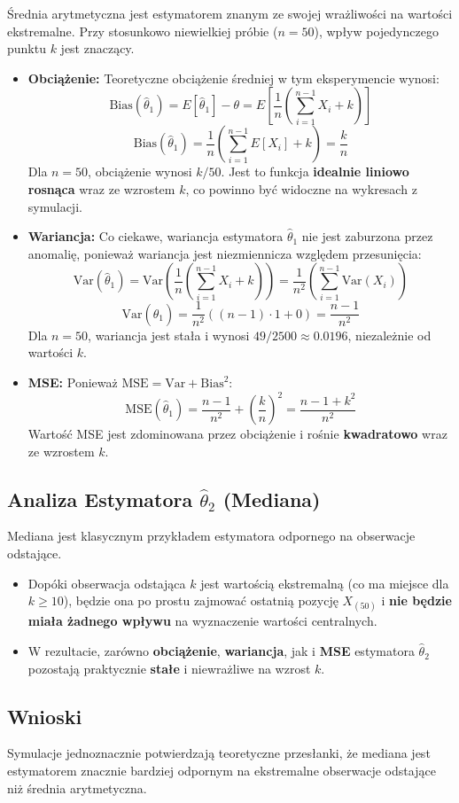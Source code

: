 \documentclass[a4paper,12pt]{article}
\begin{document}
Średnia arytmetyczna jest estymatorem znanym ze swojej wrażliwości na wartości ekstremalne. Przy stosunkowo niewielkiej próbie ($n=50$), wpływ pojedynczego punktu $k$ jest znaczący.

\begin{itemize}
    \item \textbf{Obciążenie:} Teoretyczne obciążenie średniej w tym eksperymencie wynosi:
    \[ \text{Bias}(\hat{\theta}_1) = E[\hat{\theta}_1] - \theta = E\left[ \frac{1}{n} \left(\sum_{i=1}^{n-1} X_i + k\right) \right]\]
    \[ \text{Bias}(\hat{\theta}_1) = \frac{1}{n} \left( \sum_{i=1}^{n-1} E[X_i] + k \right) = \frac{k}{n} \]
    Dla $n=50$, obciążenie wynosi $k/50$. Jest to funkcja \textbf{idealnie liniowo rosnąca} wraz ze wzrostem $k$, co powinno być widoczne na wykresach z symulacji.

    \item \textbf{Wariancja:} Co ciekawe, wariancja estymatora $\hat{\theta}_1$ nie jest zaburzona przez anomalię, ponieważ wariancja jest niezmiennicza względem przesunięcia:
    \[ \text{Var}(\hat{\theta}_1) = \text{Var}\left( \frac{1}{n} \left(\sum_{i=1}^{n-1} X_i + k\right) \right) = \frac{1}{n^2} \left( \sum_{i=1}^{n-1} \text{Var}(X_i) \right) \]
    \[ \text{Var}(\hat{\theta}_1) = \frac{1}{n^2} ( (n-1) \cdot 1 + 0 ) = \frac{n-1}{n^2} \]
    Dla $n=50$, wariancja jest stała i wynosi $49/2500 \approx 0.0196$, niezależnie od wartości $k$.

    \item \textbf{MSE:} Ponieważ $\text{MSE} = \text{Var} + \text{Bias}^2$:
    \[ \text{MSE}(\hat{\theta}_1) = \frac{n-1}{n^2} + \left(\frac{k}{n}\right)^2 = \frac{n-1 + k^2}{n^2} \]
    Wartość MSE jest zdominowana przez obciążenie i rośnie \textbf{kwadratowo} wraz ze wzrostem $k$.
\end{itemize}

\subsection*{Analiza Estymatora $\hat{\theta}_2$ (Mediana)}

Mediana jest klasycznym przykładem estymatora odpornego na obserwacje odstające.
\begin{itemize}
    \item Dopóki obserwacja odstająca $k$ jest wartością ekstremalną (co ma miejsce dla $k \ge 10$), będzie ona po prostu zajmować ostatnią pozycję $X_{(50)}$ i \textbf{nie będzie miała żadnego wpływu} na wyznaczenie wartości centralnych.
    \item W rezultacie, zarówno \textbf{obciążenie}, \textbf{wariancja}, jak i \textbf{MSE} estymatora $\hat{\theta}_2$ pozostają praktycznie \textbf{stałe} i niewrażliwe na wzrost $k$.
\end{itemize}

\subsection*{Wnioski}
Symulacje jednoznacznie potwierdzają teoretyczne przesłanki, że mediana jest estymatorem znacznie bardziej odpornym na ekstremalne obserwacje odstające niż średnia arytmetyczna.
\end{document}
